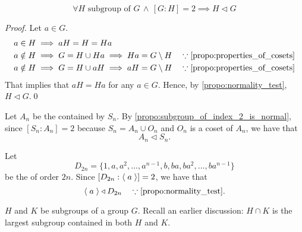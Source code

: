\begin{propo}
\label{propo:subgroup_of_index_2_is_normal}
  \begin{equation*}
    \forall H \text{ subgroup of } G \, \land \, [G : H] = 2 \implies H \triangleleft G
  \end{equation*}
\end{propo}

\begin{proof}
  Let $a \in G$.
  \begin{align*}
    a \in H &\implies aH = H = Ha \\
    a \notin H &\implies G = H \cup Ha \implies Ha = G \setminus H \quad \because \cref{propo:properties_of_cosets} \\
    a \notin H &\implies G = H \cup aH \implies aH = G \setminus H \quad \because \cref{propo:properties_of_cosets}
  \end{align*}
  That implies that $aH = Ha$ for any $a \in G$. Hence, by \cref{propo:normality_test}, $H \triangleleft G$.\qed
\end{proof}

\begin{eg}
  Let $A_n$ be the  contained by $S_n$. By \cref{propo:subgroup_of_index_2_is_normal}, since $[S_n : A_n] = 2$ because $S_n = A_n \cup O_n$ and $O_n$ is a coset of $A_n$, we have that
  \begin{equation*}
    A_n \triangleleft S_n.
  \end{equation*}
\end{eg}

\begin{eg}
  Let
  \begin{equation*}
    D_{2n} = \{1, a, a^2, ..., a^{n - 1}, b, ba, ba^2, ..., ba^{n - 1} \}
  \end{equation*}
  be the  of order $2n$. Since $[D_{2n} : \langle \; a \; \rangle] = 2$, we have that
  \begin{equation*}
    \lra{a} \triangleleft D_{2n} \quad \because \cref{propo:normality_test}.
  \end{equation*}
\end{eg}

 $H$ and $K$ be subgroups of a group $G$. Recall an earlier discussion: $H \cap K$ is the largest subgroup contained in both $H$ and $K$.

